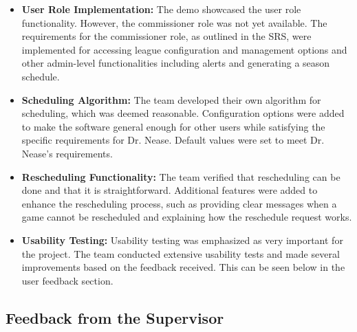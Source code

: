 \documentclass[12pt, titlepage]{article}
\begin{document}
\begin{itemize}
  \item \textbf{User Role Implementation:} The demo showcased the user role functionality. However,
  the commissioner role was not yet available. The requirements for the commissioner role, as
  outlined in the SRS, were implemented for accessing league configuration and management options and
  other admin-level functionalities including alerts and generating a season schedule.
  \item \textbf{Scheduling Algorithm:} The team developed their own algorithm for scheduling, which was
  deemed reasonable. Configuration options were added to make the software general enough for other
  users while satisfying the specific requirements for Dr. Nease. Default values were set to meet
  Dr. Nease's requirements.
  \item \textbf{Rescheduling Functionality:} The team verified that rescheduling can be done and that it
  is straightforward. Additional features were added to enhance the rescheduling process, such as
  providing clear messages when a game cannot be rescheduled and explaining how the reschedule
  request works.
  \item \textbf{Usability Testing:} Usability testing was emphasized as very important for the
  project. The team conducted extensive usability tests and made several improvements based on the
  feedback received. This can be seen below in the user feedback section.
\end{itemize}

\subsection{Feedback from the Supervisor}
\end{document}
